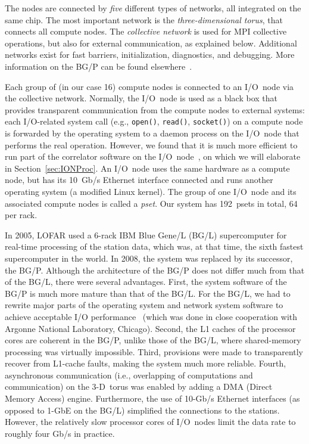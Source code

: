 The nodes are connected by \emph{five\/} different types of networks,
all integrated on the same chip.
The most important network is the \emph{three-dimensional torus}, that
connects all compute nodes.
The \emph{collective network\/} is used for MPI collective operations,
but also for external communication, as explained below.
Additional networks exist for fast barriers, initialization, diagnostics, and
debugging.
More information on the BG/P can be found elsewhere~\cite{IBM:08}.

Each group of (in our case 16) compute nodes is connected to an I/O~node via
the collective network.
Normally, the I/O~node is used as a black box that provides transparent
communication from the compute nodes to external systems: each I/O-related
system call (e.g., \texttt{open()}, \texttt{read()}, \texttt{socket()}) on a
compute node is forwarded by the operating system to a daemon process on
the I/O~node that performs the real operation.
However, we found that it is much more efficient to run part of the correlator
software on the I/O~node~\cite{Iskra:08}, on which we will elaborate in
Section~\ref{sec:IONProc}.
An I/O~node uses the same hardware as a compute node, but has its
10~Gb/s Ethernet interface connected and runs another operating system
(a modified Linux kernel).
The group of one I/O~node and its associated compute nodes is called a
\emph{pset}.
Our system has 192~psets in total, 64 per rack.

In 2005, LOFAR used a 6-rack IBM Blue Gene/L (BG/L) supercomputer for real-time
processing of the station data, which was, at that time, the sixth fastest
supercomputer in the world.
In 2008, the system was replaced by its successor, the BG/P.
Although the architecture of the BG/P does not differ much from that
of the BG/L, there were several advantages.
First, the system software of the BG/P is much more mature than that of the
BG/L.
For the BG/L, we had to rewrite major parts of the operating system and network
system software to achieve acceptable I/O
performance~\cite{Iskra:08,Boonstoppel:08} (which was done in close cooperation
with Argonne National Laboratory, Chicago).
Second, the L1 caches of the processor cores are coherent in the BG/P, unlike
those of the BG/L, where shared-memory processing was virtually impossible.
Third, provisions were made to transparently recover from L1-cache faults,
making the system much more reliable.
Fourth, asynchronous communication (i.e., overlapping of computations and
communication) on the 3-D~torus was enabled by adding a DMA (Direct Memory
Access) engine.
Furthermore, the use of 10-Gb/s Ethernet interfaces (as opposed to 1-GbE on
the BG/L) simplified the connections to the stations.
However, the relatively slow processor cores of I/O~nodes limit the data rate
to roughly four Gb/s in practice.



